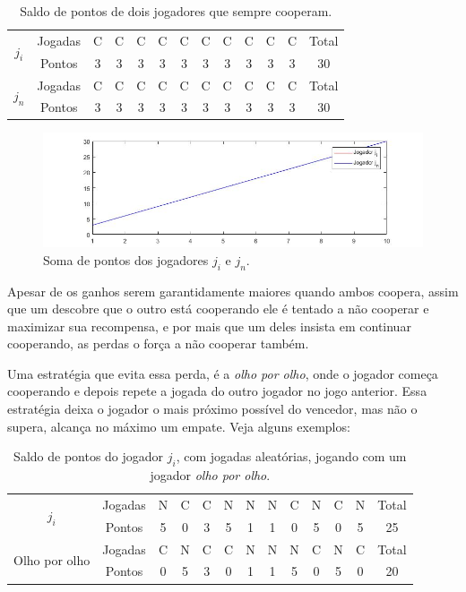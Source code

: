 \begin{table}[H]
\centering
\begin{tabular}{|c|c|c|c|c|c|c|c|c|c|c|c|c|}\hline
\multirow{2}{*}{$j_i$} & Jogadas & C & C & C & C & C & C & C & C & C & C & Total\\\cline{2-12}
 & Pontos & 3 & 3 & 3 & 3 & 3 & 3 & 3 & 3 & 3 & 3 & 30\\\hline\hline
\multirow{2}{*}{$j_n$} & Jogadas & C & C & C & C & C & C & C & C & C & C & Total\\\cline{2-12}
 & Pontos & 3 & 3 & 3 & 3 & 3 & 3 & 3 & 3 & 3 & 3 & 30\\\hline
\end{tabular}
\caption{Saldo de pontos de dois jogadores que sempre cooperam.}
\label{tab4}
\end{table}

\begin{figure}[H]
\centering
\includegraphics[width=14cm]{graf4.jpg}
\caption{Soma de pontos dos jogadores $j_i$ e $j_n$.}
\label{fig4}
\end{figure}

Apesar de os ganhos serem garantidamente maiores quando ambos coopera, assim que um descobre que o outro está cooperando ele é tentado a não cooperar e maximizar sua recompensa, e por mais que um deles insista em continuar cooperando, as perdas o força a não cooperar também.

Uma estratégia que evita essa perda, é a \textit{olho por olho}, onde o jogador começa cooperando e depois repete a jogada do outro jogador no jogo anterior. Essa estratégia deixa o jogador o mais próximo possível do vencedor, mas não o supera, alcança no máximo um empate. Veja alguns exemplos: 

\begin{table}[H]
\centering
\begin{tabular}{|c|c|c|c|c|c|c|c|c|c|c|c|c|}\hline
\multirow{2}{*}{$j_i$} & Jogadas & N & C & C & N & N & N & C & N &	C &	N & Total\\\cline{2-12}
 & Pontos & 5 & 0 & 3 & 5 & 1 & 1 & 0 & 5 & 0 & 5 & 25\\\hline\hline
\multirow{2}{*}{Olho por olho} & Jogadas & C & N & C & C & N & N & N & C &	N &	C & Total\\\cline{2-12}
 & Pontos & 0 & 5 & 3 & 0 & 1 & 1 & 5 & 0 & 5 & 0 & 20\\\hline
\end{tabular}
\caption{Saldo de pontos do jogador $j_i$, com jogadas aleatórias, jogando com um jogador \textit{olho por olho}.}
\label{tab5}
\end{table}

